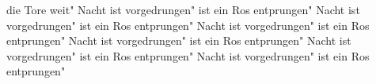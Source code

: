 \ifx\mxversion\undefined
  
  
  
  
\fi

%
\tableofcontents
\normalmusicsize
 die Tore weit"
 Nacht ist vorgedrungen"
 ist ein Ros entprungen"
 Nacht ist vorgedrungen"
 ist ein Ros entprungen"
 Nacht ist vorgedrungen"
 ist ein Ros entprungen"
 Nacht ist vorgedrungen"
 ist ein Ros entprungen"
 Nacht ist vorgedrungen"
 ist ein Ros entprungen"
 Nacht ist vorgedrungen"
 ist ein Ros entprungen"

\bookbye